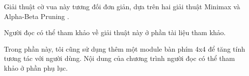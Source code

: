 Giải thuật cờ vua này tương đối đơn giản, dựa trên hai giải thuật Minimax \cite{minimax_chess_programming} và Alpha-Beta Pruning \cite{alpha_beta_chess_programming}.

Người đọc có thể tham khảo về giải thuật này ở phần tài liệu tham khảo.

Trong phần này, tôi cũng sử dụng thêm một module bàn phím 4x4 để tăng tính tương tác với người dùng.
Nội dung của chương trình người đọc có thể tham khảo ở phần phụ lục. %
